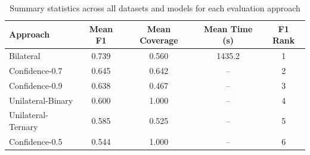 \documentclass{article}
\begin{document}
\begin{table}[htbp]
\centering
\caption{Summary statistics across all datasets and models for each evaluation approach}
\label{tab:summary_stats}
\begin{tabular}{lcccc}
\toprule
\textbf{Approach} & \textbf{Mean F1} & \textbf{Mean Coverage} & \textbf{Mean Time (s)} & \textbf{F1 Rank} \\
\midrule
Bilateral & 0.739 & 0.560 & 1435.2 & 1 \\
Confidence-0.7 & 0.645 & 0.642 & -- & 2 \\
Confidence-0.9 & 0.638 & 0.467 & -- & 3 \\
Unilateral-Binary & 0.600 & 1.000 & -- & 4 \\
Unilateral-Ternary & 0.585 & 0.525 & -- & 5 \\
Confidence-0.5 & 0.544 & 1.000 & -- & 6 \\
\bottomrule
\end{tabular}
\end{table}
\end{document}
